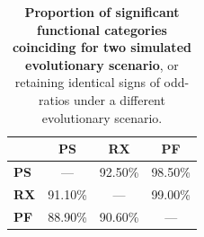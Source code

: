 \begin{table}
  \begin{center}
    \scriptsize
    \begin{tabular}{l c c c}
                     & \textbf{PS} & \textbf{RX} & \textbf{PF} \\ \hline
         \textbf{PS} & ---         & 92.50\%     & 98.50\%     \\
         \textbf{RX} & 91.10\%     & ---         & 99.00\%     \\
         \textbf{PF} & 88.90\%     & 90.60\%     & ---         \\ \hline
    \end{tabular}
  \end{center}
  \caption[Proportion of significant functional categories coinciding in two simulated evolutionary scenarios]{
    \textbf{Proportion of significant functional categories coinciding for two simulated evolutionary scenario}, or retaining identical signs of odd-ratios under a different evolutionary scenario.}
  \label{tab:prop_signif}
\end{table}


